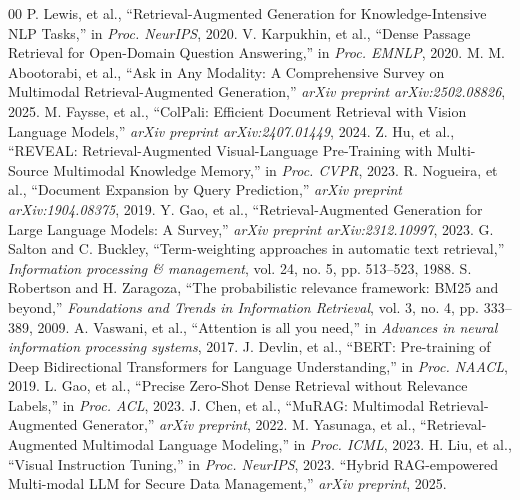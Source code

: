 \documentclass[conference]{IEEEtran}
\begin{document}

\begin{thebibliography}{00}
 P. Lewis, et al., ``Retrieval-Augmented Generation for Knowledge-Intensive NLP Tasks,'' in \textit{Proc. NeurIPS}, 2020.
 V. Karpukhin, et al., ``Dense Passage Retrieval for Open-Domain Question Answering,'' in \textit{Proc. EMNLP}, 2020.
 M. M. Abootorabi, et al., ``Ask in Any Modality: A Comprehensive Survey on Multimodal Retrieval-Augmented Generation,'' \textit{arXiv preprint arXiv:2502.08826}, 2025.
 M. Faysse, et al., ``ColPali: Efficient Document Retrieval with Vision Language Models,'' \textit{arXiv preprint arXiv:2407.01449}, 2024.
 Z. Hu, et al., ``REVEAL: Retrieval-Augmented Visual-Language Pre-Training with Multi-Source Multimodal Knowledge Memory,'' in \textit{Proc. CVPR}, 2023.
 R. Nogueira, et al., ``Document Expansion by Query Prediction,'' \textit{arXiv preprint arXiv:1904.08375}, 2019.
 Y. Gao, et al., ``Retrieval-Augmented Generation for Large Language Models: A Survey,'' \textit{arXiv preprint arXiv:2312.10997}, 2023.
 G. Salton and C. Buckley, ``Term-weighting approaches in automatic text retrieval,'' \textit{Information processing \& management}, vol. 24, no. 5, pp. 513--523, 1988.
 S. Robertson and H. Zaragoza, ``The probabilistic relevance framework: BM25 and beyond,'' \textit{Foundations and Trends in Information Retrieval}, vol. 3, no. 4, pp. 333--389, 2009.
 A. Vaswani, et al., ``Attention is all you need,'' in \textit{Advances in neural information processing systems}, 2017.
 J. Devlin, et al., ``BERT: Pre-training of Deep Bidirectional Transformers for Language Understanding,'' in \textit{Proc. NAACL}, 2019.
 L. Gao, et al., ``Precise Zero-Shot Dense Retrieval without Relevance Labels,'' in \textit{Proc. ACL}, 2023.
 J. Chen, et al., ``MuRAG: Multimodal Retrieval-Augmented Generator,'' \textit{arXiv preprint}, 2022.
 M. Yasunaga, et al., ``Retrieval-Augmented Multimodal Language Modeling,'' in \textit{Proc. ICML}, 2023.
 H. Liu, et al., ``Visual Instruction Tuning,'' in \textit{Proc. NeurIPS}, 2023.
``Hybrid RAG-empowered Multi-modal LLM for Secure Data Management,'' \textit{arXiv preprint}, 2025.

\end{thebibliography}
\end{document}
